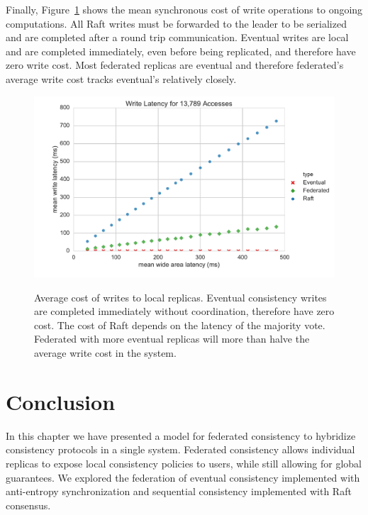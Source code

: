 Finally, Figure~\ref{fig:ch04_latency_write_latency} shows the mean synchronous cost of write operations to ongoing computations.
All Raft writes must be forwarded to the leader to be serialized and are completed after a round trip communication.
Eventual writes are local and are completed immediately, even before being replicated, and therefore have zero write cost.
Most federated replicas are eventual and therefore federated's average write cost tracks eventual's relatively closely.

\begin{figure}
    \begin{center}
        \includegraphics[width=5in]{figures/ch04_latency_write_latency.pdf}
    \end{center}
    \renewcommand{\baselinestretch}{1}
    \small\normalsize

    \begin{quote}
        \caption[Latency Simulation Write Latency]{Average cost of writes to local replicas. Eventual consistency writes are completed immediately without coordination, therefore have zero cost. The cost of Raft depends on the latency of the majority vote. Federated with more eventual replicas will more than halve the average write cost in the system.}
        \label{fig:ch04_latency_write_latency}
    \end{quote}
\end{figure}
\renewcommand{\baselinestretch}{2}
\small\normalsize

\section{Conclusion}
\label{ch04_conclusion}

In this chapter we have presented a model for federated consistency to hybridize consistency protocols in a single system.
Federated consistency allows individual replicas to expose local consistency policies to users, while still allowing for global guarantees.
We explored the federation of eventual consistency implemented with anti-entropy synchronization and sequential consistency implemented with Raft consensus.

